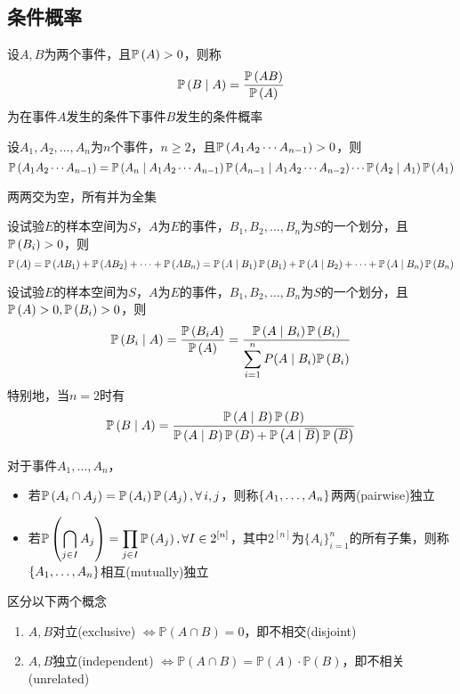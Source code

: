 \subsection{条件概率}
\begin{definition}[条件概率]
设$A,B$为两个事件，且$\mathbb{P}\left(A\right)>0$，则称
\[\mathbb{P}\left(B\mid A\right)=\dfrac{\mathbb{P}\left(AB\right)}{\mathbb{P}\left(A\right)}\]
为在事件$A$发生的条件下事件$B$发生的条件概率
\end{definition}
\begin{theorem}[乘法公式]
设$A_1,A_2,\ldots,A_n$为$n$个事件，$n\geq 2$，且$\mathbb{P}\left(A_1A_2\cdots A_{n-1}\right)>0$，则
\[\mathbb{P}\left(A_1A_2\cdots A_{n-1}\right)=\mathbb{P}\left(A_n\mid A_1A_2\cdots A_{n-1}\right)\mathbb{P}\left(A_{n-1}\mid A_1A_2\cdots A_{n-2}\right)\cdots\mathbb{P}\left(A_2\mid A_1\right)\mathbb{P}\left(A_1\right)\]
\end{theorem}
\begin{definition}[划分]
两两交为空，所有并为全集
\end{definition}
\begin{theorem}[全概率公式]
设试验$E$的样本空间为$S$，$A$为$E$的事件，$B_1,B_2,\ldots,B_n$为$S$的一个划分，且$\mathbb{P}\left(B_i\right)>0$，则
\[\mathbb{P}\left(A\right)=\mathbb{P}\left(AB_1\right)+\mathbb{P}\left(AB_2\right)+\cdots+\mathbb{P}\left(AB_n\right)=\mathbb{P}\left(A\mid B_1\right)\mathbb{P}\left(B_1\right)+\mathbb{P}\left(A\mid B_2\right)+\cdots+\mathbb{P}\left(A\mid B_n\right)\mathbb{P}\left(B_n\right)\]
\end{theorem}
\begin{theorem}
设试验$E$的样本空间为$S$，$A$为$E$的事件，$B_1,B_2,\ldots,B_n$为$S$的一个划分，且$\mathbb{P}\left(A\right)>0,\mathbb{P}\left(B_i\right)>0$，则
\[\mathbb{P}\left(B_i\mid A\right)=\frac{\mathbb{P}\left(B_iA\right)}{\mathbb{P}\left(A\right)}=\frac{\mathbb{P}\left(A\mid B_i\right)\mathbb{P}\left(B_i\right)}{\displaystyle\sum_{i=1}^nP(A\mid B_i)\mathbb{P}\left(B_i\right)}\]
特别地，当$n=2$时有
\[\mathbb{P}\left(B\mid A\right)=\dfrac{\mathbb{P}\left(A\mid B\right)\mathbb{P}\left(B\right)}{\mathbb{P}\left(A\mid B\right)\mathbb{P}\left(B\right)+\mathbb{P}\left(A\mid \mathop{\overline{B}}\right)\mathbb{P}\left(\mathop{\overline{B}}\right)}\]
\end{theorem}
\begin{definition}[独立性]
\rm 对于事件$A_1,\ldots,A_n$，
\begin{itemize}
	\item 若$\mathbb{P}\left(A_i\cap A_j\right)=\mathbb{P}\left(A_i\right)\mathbb{P}\left(A_j\right),\forall\,i,j$，则称$\{A_1,\dots,A_n\}$两两(pairwise)独立
	\item 若$\displaystyle\mathbb{P}\left(\bigcap_{j\in I}A_j\right)=\prod_{j\in I}\mathbb{P}\left(A_j\right),\forall I\in 2^{[n]}$，其中$2^{[n]}$为$\{A_i\}_{i=1}^n$的所有子集，则称$\{A_1,\dots,A_n\}$相互(mutually)独立
\end{itemize}
\end{definition}
\par 区分以下两个概念
\begin{enumerate}
	\item $A,B$对立(exclusive) $\Leftrightarrow \mathbb{P}(A\cap B)=0$，即不相交(disjoint)
	\item $A,B$独立(independent) $\Leftrightarrow \mathbb{P}(A\cap B)=\mathbb{P}(A)\cdot\mathbb{P}(B)$，即不相关(unrelated)
\end{enumerate}